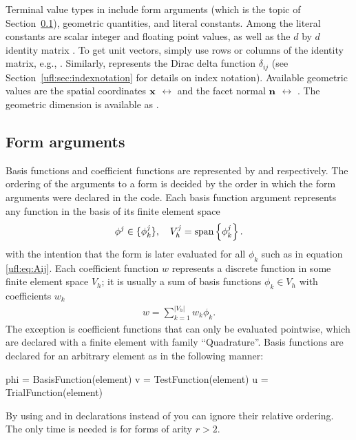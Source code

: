 Terminal value types in \ufl{} include form arguments (which is the
topic of Section~\ref{ufl:sec:arguments}), geometric quantities, and
literal constants.  Among the literal constants are scalar integer and
floating point values, as well as the $d$ by $d$ identity matrix
.  To get unit vectors, simply use rows or
columns of the identity matrix, e.g., .  Similarly,
 represents the Dirac delta function $\delta_{ij}$ (see
Section~\ref{ufl:sec:indexnotation} for details on index notation).
Available geometric values are the spatial coordinates $\mathbf{x}$
$\leftrightarrow$  and the facet normal $\mathbf{n}$
$\leftrightarrow$ .  The geometric dimension is
available as .

\subsection{Form arguments} \label{ufl:sec:arguments}

Basis functions and coefficient functions are represented by
 and  respectively. The ordering
of the arguments to a form is decided by the order in which the form
arguments were declared in the \ufl{} code.  Each basis function
argument represents any function in the basis of its finite element
space
\begin{align}
  \phi^j \in \{\phi_k^j\}, \quad V_h^j = \operatorname{span}\left\{ \phi_k^j \right\}.
\end{align}
with the intention that the form is later evaluated for all $\phi_k$
such as in equation \eqref{ufl:eq:Aij}.  Each coefficient function $w$
represents a discrete function in some finite element space $V_h$; it
is usually a sum of basis functions $\phi_k \in V_h$ with coefficients
$w_k$
\begin{align}
w = \sum_{k=1}^{|V_h|} w_k \phi_k.
\end{align}
The exception is coefficient functions that can only be evaluated
pointwise, which are declared with a finite element with family
``Quadrature''.  Basis functions are declared for an arbitrary element
as in the following manner:
\begin{code}
phi = BasisFunction(element)
v = TestFunction(element)
u = TrialFunction(element)
\end{code}
By using  and  in
declarations instead of  you can ignore their
relative ordering.  The only time  is needed is
for forms of arity $r > 2$.

